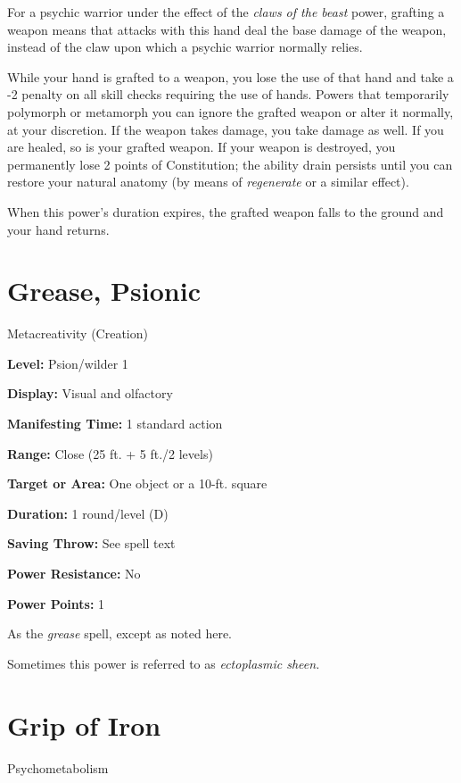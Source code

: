 \documentclass{article}
\begin{document}
For a psychic warrior under the effect of the \textit{claws of the beast }power, 
grafting a weapon means that attacks with this hand deal the base damage of the 
weapon, instead of the claw upon which a psychic warrior normally relies.

While your hand is grafted to a weapon, you lose the use of that hand and take 
a -2 penalty on all skill checks requiring the use of hands. Powers that temporarily 
polymorph or metamorph you can ignore the grafted weapon or alter it normally, 
at your discretion. If the weapon takes damage, you take damage as well. If you 
are healed, so is your grafted weapon. If your weapon is destroyed, you permanently 
lose 2 points of Constitution; the ability drain persists until you can restore 
your natural anatomy (by means of \textit{regenerate }or a similar effect).

When this power's duration expires, the grafted weapon falls to the ground and 
your hand returns.

\vspace{12pt}
\section*{Grease, Psionic}

Metacreativity (Creation)

\textbf{Level:} Psion/wilder 1

\textbf{Display:} Visual and olfactory

\textbf{Manifesting Time:} 1 standard action

\textbf{Range:} Close (25 ft. + 5 ft./2 levels) 

\textbf{Target or Area:} One object or a 10-ft. square

\textbf{Duration:} 1 round/level (D)

\textbf{Saving Throw:} See spell text

\textbf{Power Resistance:} No

\textbf{Power Points:} 1

As the \textit{grease }spell, except as noted here.

Sometimes this power is referred to as \textit{ectoplasmic sheen.}

\vspace{12pt}
\section*{Grip of Iron}

Psychometabolism
\end{document}
